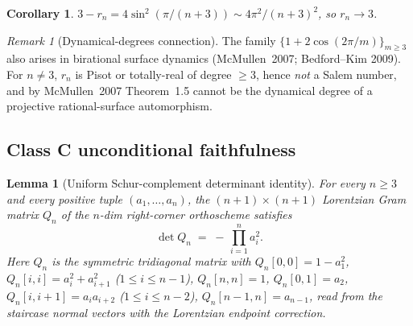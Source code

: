 \documentclass[11pt,a4paper]{article}
\newtheorem{lemma}[theorem]{Lemma}
\newtheorem{corollary}[theorem]{Corollary}
\theoremstyle{remark}
\newtheorem{remark}[theorem]{Remark}
\theoremstyle{plain}
\begin{document}
\begin{corollary}
$3 - r_n = 4\sin^2(\pi/(n+3)) \sim 4\pi^2/(n+3)^2$, so $r_n \to 3$.
\end{corollary}

\begin{remark}[Dynamical-degrees connection]
\label{rem:mcmullen-salem-precise}
The family $\{1 + 2\cos(2\pi/m)\}_{m \ge 3}$ also arises in birational
surface dynamics (McMullen~2007; Bedford--Kim 2009).  For $n \ne 3$,
$r_n$ is Pisot or totally-real of degree $\ge 3$, hence \emph{not} a
Salem number, and by McMullen~2007 Theorem~1.5 cannot be the dynamical
degree of a projective rational-surface automorphism.
\end{remark}

\subsection{Class C unconditional faithfulness}

\begin{lemma}[Uniform Schur-complement determinant identity]
\label{lem:uniform-detQ}
For every $n \ge 3$ and every positive tuple $(a_1, \ldots, a_n)$, the
$(n+1) \times (n+1)$ Lorentzian Gram matrix $Q_n$ of the $n$-dim
right-corner orthoscheme satisfies
\[
\det Q_n \;=\; -\, \prod_{i=1}^{n} a_i^2.
\]
Here $Q_n$ is the symmetric tridiagonal matrix with
$Q_n[0,0] = 1 - a_1^2$, $Q_n[i,i] = a_i^2 + a_{i+1}^2$ ($1 \le i \le n-1$),
$Q_n[n,n] = 1$, $Q_n[0,1] = a_2$, $Q_n[i,i+1] = a_i a_{i+2}$ ($1 \le i \le n-2$),
$Q_n[n-1,n] = a_{n-1}$, read from the staircase normal vectors with the
Lorentzian endpoint correction.
\end{lemma}
\end{document}
